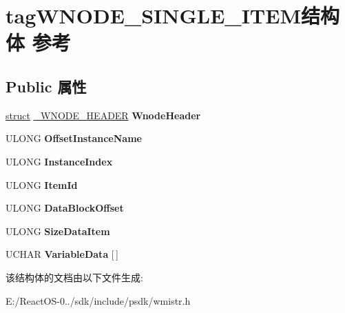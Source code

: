 \hypertarget{structtag_w_n_o_d_e___s_i_n_g_l_e___i_t_e_m}{}\section{tag\+W\+N\+O\+D\+E\+\_\+\+S\+I\+N\+G\+L\+E\+\_\+\+I\+T\+E\+M结构体 参考}
\label{structtag_w_n_o_d_e___s_i_n_g_l_e___i_t_e_m}
\subsection*{Public 属性}
\begin{DoxyCompactItemize}
\item 
\mbox{\label{structtag_w_n_o_d_e___s_i_n_g_l_e___i_t_e_m_a5703418c2fe08585d783a0ec668651e7}} 
\hyperlink{interfacestruct}{struct} \hyperlink{struct___w_n_o_d_e___h_e_a_d_e_r}{\+\_\+\+W\+N\+O\+D\+E\+\_\+\+H\+E\+A\+D\+ER} {\bfseries Wnode\+Header}
\item 
\mbox{\label{structtag_w_n_o_d_e___s_i_n_g_l_e___i_t_e_m_a9b4aed6cdaedf335d9ef8f0705ffa299}} 
U\+L\+O\+NG {\bfseries Offset\+Instance\+Name}
\item 
\mbox{\label{structtag_w_n_o_d_e___s_i_n_g_l_e___i_t_e_m_a3226a9871d3e221e21dedc5de10dadbe}} 
U\+L\+O\+NG {\bfseries Instance\+Index}
\item 
\mbox{\label{structtag_w_n_o_d_e___s_i_n_g_l_e___i_t_e_m_ab58ba593fb9ddbc2a9402893ac508a76}} 
U\+L\+O\+NG {\bfseries Item\+Id}
\item 
\mbox{\label{structtag_w_n_o_d_e___s_i_n_g_l_e___i_t_e_m_a1b4e37a30af7dd0167bd6c2ee45ea728}} 
U\+L\+O\+NG {\bfseries Data\+Block\+Offset}
\item 
\mbox{\label{structtag_w_n_o_d_e___s_i_n_g_l_e___i_t_e_m_a14dc290eb361c4fb96f950a29b30633e}} 
U\+L\+O\+NG {\bfseries Size\+Data\+Item}
\item 
\mbox{\label{structtag_w_n_o_d_e___s_i_n_g_l_e___i_t_e_m_abe3837604dd83dfdae4e487f554e3d98}} 
U\+C\+H\+AR {\bfseries Variable\+Data} \mbox{[}$\,$\mbox{]}
\end{DoxyCompactItemize}


该结构体的文档由以下文件生成\+:\begin{DoxyCompactItemize}
\item 
E\+:/\+React\+O\+S-\/0../sdk/include/psdk/wmistr.\+h\end{DoxyCompactItemize}
